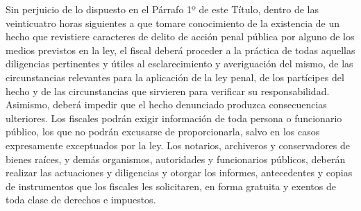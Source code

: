    Sin perjuicio de lo dispuesto en el Párrafo 1º de este Título, dentro de las veinticuatro horas siguientes a que tomare conocimiento de la existencia de un hecho que revistiere caracteres de delito de acción penal pública por alguno de los medios previstos en la ley, el fiscal deberá proceder a la práctica de todas aquellas diligencias pertinentes y útiles al esclarecimiento y averiguación del mismo, de las circunstancias relevantes para la aplicación de la ley penal, de los partícipes del hecho y de las circunstancias que sirvieren para verificar su responsabilidad. Asimismo, deberá impedir que el hecho denunciado produzca consecuencias ulteriores.
    Los fiscales podrán exigir información de toda persona o funcionario público, los que no podrán excusarse de proporcionarla, salvo en los casos expresamente exceptuados por la ley. Los notarios, archiveros y conservadores de bienes raíces, y demás organismos, autoridades y funcionarios públicos, deberán realizar las actuaciones y diligencias y otorgar los informes, antecedentes y copias de instrumentos que los fiscales les solicitaren, en forma gratuita y exentos de toda clase de derechos e impuestos.

